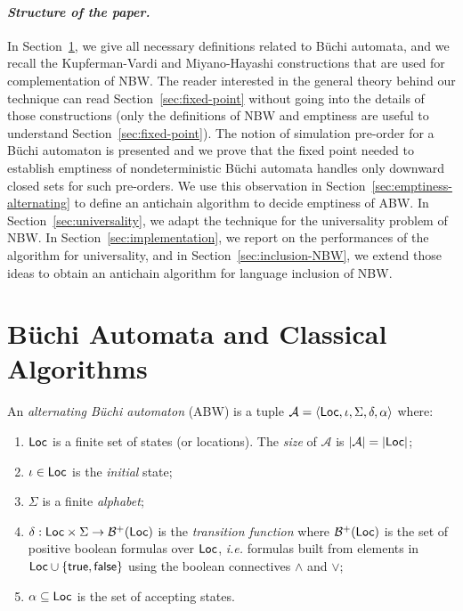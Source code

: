 \documentclass{LMCS}
\def\abs#1{\ensuremath{\lvert #1\rvert}}
\newcommand{\Loc}{{\sf Loc}}
\newcommand{\tuple}[1]{\langle #1 \rangle}
\newcommand{\A}{\mathcal{A}}
\newcommand{\B}{\mathcal{B}}
\newcommand{\true}{{\sf true}}
\newcommand{\false}{{\sf false}}
\begin{document}
\paragraph{{\it Structure of the paper.}}
In Section~\ref{sec:definitions}, we give all necessary definitions related to 
B\"uchi automata, and we recall the Kupferman-Vardi and
Miyano-Hayashi constructions that are used for complementation of NBW.
The reader interested in the general theory behind our technique can read 
Section~\ref{sec:fixed-point} without going into the details of those constructions
(only the definitions of NBW and emptiness are useful to understand Section~\ref{sec:fixed-point}). 
The notion of simulation pre-order for a B\"uchi automaton is presented and we prove 
that the fixed point needed to establish emptiness of nondeterministic B\"uchi automata
handles only downward closed sets for such pre-orders. 
We use this observation in Section~\ref{sec:emptiness-alternating} to define an antichain algorithm
to decide emptiness of ABW. In Section~\ref{sec:universality}, we
adapt the technique for the universality problem of NBW. In
Section~\ref{sec:implementation}, we report on the performances of the
algorithm for universality, and in Section~\ref{sec:inclusion-NBW},
we extend those ideas to obtain an antichain algorithm for language inclusion
of NBW. 



\section{B\"uchi Automata and Classical Algorithms}\label{sec:definitions}


\begin{defi}\label{def:ABW}
An \emph{alternating B\"uchi automaton} (ABW) is a tuple 
$\A = \tuple{\Loc, \iota, \Sigma, \delta, \alpha}$ where: 

\begin{enumerate}[$\bullet$]

\item $\Loc$ is a finite set of states (or locations). 
The \emph{size} of $\A$ is $\abs{\A} = \abs{\Loc}$; 

\item $\iota \in \Loc$ is the \emph{initial} state;

\item $\Sigma$ is a finite \emph{alphabet};

\item $\delta: \Loc \times \Sigma \to \B^+(\Loc)$ is the \emph{transition function} 
where $\B^+(\Loc)$ is the set of positive boolean formulas over $\Loc$, 
{\it i.e.} formulas built from elements in  $\Loc \cup \{\true, \false\}$ 
using the boolean connectives $\land$ and $\lor$; 

\item $\alpha \subseteq \Loc$ is the set of accepting states.

\end{enumerate}
\end{defi}
\end{document}
